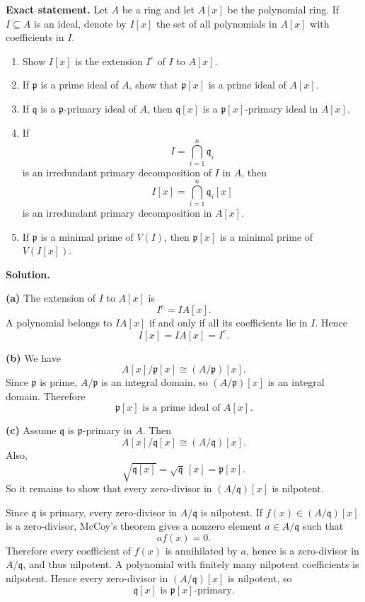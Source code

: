 \documentclass[12pt,a4paper]{article}
\theoremstyle{plain}
\theoremstyle{definition}      %
\begin{document}
	\textbf{Exact statement.}
	Let \(A\) be a ring and let \(A[x]\) be the polynomial ring.
	If \(I\subseteq A\) is an ideal, denote by \(I[x]\) the set of all polynomials in \(A[x]\) with coefficients in \(I\).
	
	\begin{enumerate}[label=(\alph*)]
		\item Show \(I[x]\) is the extension \(I^e\) of \(I\) to \(A[x]\).
		
		\item If \(\mathfrak p\) is a prime ideal of \(A\), show that \(\mathfrak p[x]\) is a prime ideal of \(A[x]\).
		
		\item If \(\mathfrak q\) is a \(\mathfrak p\)-primary ideal of \(A\), then \(\mathfrak q[x]\) is a \(\mathfrak p[x]\)-primary ideal in \(A[x]\).
		
		\item If
		\[
		I=\bigcap_{i=1}^n \mathfrak q_i
		\]
		is an irredundant primary decomposition of \(I\) in \(A\), then
		\[
		I[x]=\bigcap_{i=1}^n \mathfrak q_i[x]
		\]
		is an irredundant primary decomposition in \(A[x]\).
		
		\item If \(\mathfrak p\) is a minimal prime of \(V(I)\), then \(\mathfrak p[x]\) is a minimal prime of \(V(I[x])\).
	\end{enumerate}
	
	\textbf{Solution.}
	
	\textbf{(a)}
	The extension of \(I\) to \(A[x]\) is
	\[
	I^e=IA[x].
	\]
	A polynomial belongs to \(IA[x]\) if and only if all its coefficients lie in \(I\).
	Hence
	\[
	\boxed{I[x]=IA[x]=I^e.}
	\]
	
	\textbf{(b)}
	We have
	\[
	A[x]/\mathfrak p[x]\cong (A/\mathfrak p)[x].
	\]
	Since \(\mathfrak p\) is prime, \(A/\mathfrak p\) is an integral domain, so \((A/\mathfrak p)[x]\) is an integral domain.
	Therefore
	\[
	\boxed{\mathfrak p[x]\text{ is a prime ideal of }A[x].}
	\]
	
	\textbf{(c)}
	Assume \(\mathfrak q\) is \(\mathfrak p\)-primary in \(A\).
	Then
	\[
	A[x]/\mathfrak q[x]\cong (A/\mathfrak q)[x].
	\]
	Also,
	\[
	\sqrt{\mathfrak q[x]}=\sqrt{\mathfrak q}\,[x]=\mathfrak p[x].
	\]
	So it remains to show that every zero-divisor in \((A/\mathfrak q)[x]\) is nilpotent.
	
	Since \(\mathfrak q\) is primary, every zero-divisor in \(A/\mathfrak q\) is nilpotent.
	If \(f(x)\in (A/\mathfrak q)[x]\) is a zero-divisor, McCoy's theorem gives a nonzero element \(a\in A/\mathfrak q\) such that
	\[
	a f(x)=0.
	\]
	Therefore every coefficient of \(f(x)\) is annihilated by \(a\), hence is a zero-divisor in \(A/\mathfrak q\), and thus nilpotent.
	A polynomial with finitely many nilpotent coefficients is nilpotent.
	Hence every zero-divisor in \((A/\mathfrak q)[x]\) is nilpotent, so
	\[
	\boxed{\mathfrak q[x]\text{ is }\mathfrak p[x]\text{-primary}.}
	\]
	
\end{document}
